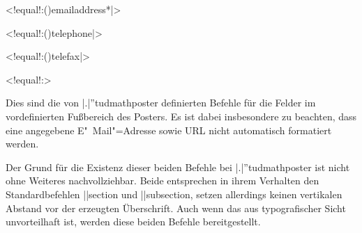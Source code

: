 \begin{DeclareEntity}{}
\begin{NoIndexDefault}
\begin{Declaration}
  {}
  <!equal!:\Macro(){emailaddress*|}>
\begin{Declaration}
  {}
  <!equal!:\Macro(){telephone|}>
\begin{Declaration}
  {}
  <!equal!:\Macro(){telefax|}>
\begin{Declaration}
  {}
  <!equal!:>
\printdeclarationlist

Dies sind die von \Class|.|''{tudmathposter} definierten Befehle für die Felder 
im vordefinierten Fußbereich des Posters. Es ist dabei insbesondere zu 
beachten, dass eine angegebene E"~Mail"=Adresse sowie URL nicht automatisch 
formatiert werden.
\end{Declaration}
\end{Declaration}
\end{Declaration}
\end{Declaration}

\begin{Declaration}
  {}
\begin{Declaration}
  {}
\printdeclarationlist

Der Grund für die Existenz dieser beiden Befehle bei \Class|.|''{tudmathposter} 
ist nicht ohne Weiteres nachvollziehbar. Beide entsprechen in ihrem Verhalten 
den Standardbefehlen \Macro||{section} und \Macro||{subsection}, setzen 
allerdings keinen vertikalen Abstand vor der erzeugten Überschrift. Auch wenn 
das aus typografischer Sicht unvorteilhaft ist, werden diese beiden Befehle 
bereitgestellt.
\end{Declaration}
\end{Declaration}

\begin{Declaration}
  {}
\begin{Declaration}
  {}
\begin{Declaration}
  {}
\begin{Declaration}
  {}
\printdeclarationlist


\end{Declaration}
\end{Declaration}
\end{Declaration}
\end{Declaration}
\end{NoIndexDefault}
\end{DeclareEntity}
